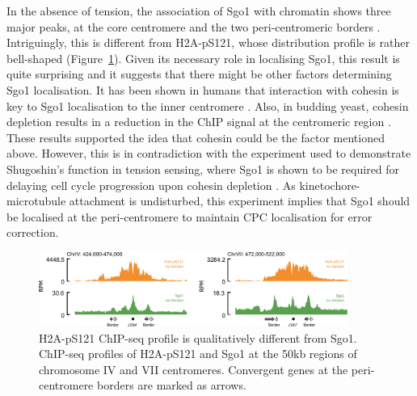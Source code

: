 In the absence of tension, the association of Sgo1 with chromatin shows three major peaks, at the core centromere and the two peri-centromeric borders \citep{Verzijlbergen2014, Paldi2020ConvergentPericentromeres}. Intriguingly, this is different from H2A-pS121, whose distribution profile is rather bell-shaped (Figure~\ref{fig:sgo1comparison}). Given its necessary role in localising Sgo1, this result is quite surprising and it suggests that there might be other factors determining Sgo1 localisation. It has been shown in humans that interaction with cohesin is key to Sgo1 localisation to the inner centromere \citep{Liu2013a}. Also, in budding yeast, cohesin depletion results in a reduction in the ChIP signal at the centromeric region \citep{Verzijlbergen2014}. These results supported the idea that cohesin could be the factor mentioned above. However, this is in contradiction with the experiment used to demonstrate Shugoshin's function in tension sensing, where Sgo1 is shown to be required for delaying cell cycle progression upon cohesin depletion \citep{Indjeian2005a}. As kinetochore-microtubule attachment is undisturbed, this experiment implies that Sgo1 should be localised at the peri-centromere to maintain CPC localisation for error correction. 

\begin{figure}[htbp]
  \centering
  \includegraphics[width=0.9\textwidth]{chapter3/figures/Sgo1 comparison.pdf}
  \caption[H2A-pS121 ChIP-seq profile is qualitatively different from Sgo1]{H2A-pS121 ChIP-seq profile is qualitatively different from Sgo1. ChIP-seq profiles of H2A-pS121 and Sgo1 \citep{Paldi2020ConvergentPericentromeres} at the 50kb regions of chromosome IV and VII centromeres. Convergent genes at the peri-centromere borders are marked as arrows. }
  \label{fig:sgo1comparison}
\end{figure}

